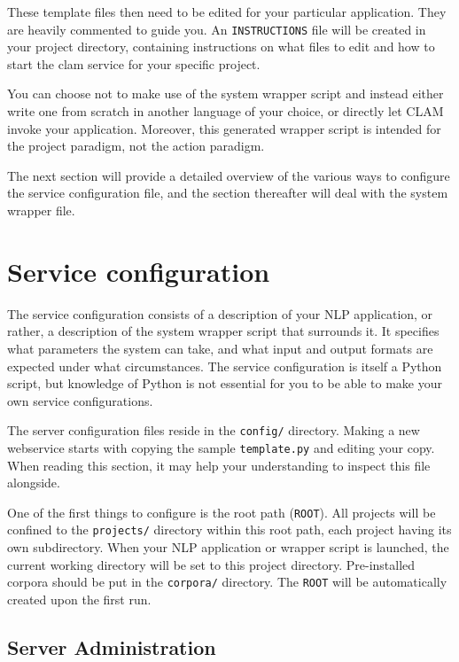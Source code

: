 \documentclass[a4paper,12pt,twoside,openright]{report}
\begin{document}
These template files then need to be edited for your particular application.
They are heavily commented to guide you. An \texttt{INSTRUCTIONS} file will be
created in your project directory, containing instructions on what files to
edit and  how to start the clam service for your specific project.

You can choose not to make use of the system wrapper script and instead either
write one from scratch in another language of your choice, or directly let CLAM
invoke your application. Moreover, this generated wrapper script is intended for the
project paradigm, not the action paradigm.

The next section will provide a detailed overview of the various ways to
configure the service configuration file, and the section thereafter will deal
with the system wrapper file.

\section{Service configuration}
\label{sec:serviceconfig}

The service configuration consists of a description of your NLP application, or
rather, a description of the system wrapper script that surrounds it. It
specifies what parameters the system can take, and what input and output
formats are expected under what circumstances. The service configuration is
itself a Python script, but knowledge of Python is not essential for you to be
able to make your own service configurations. 

The server configuration files reside in the \texttt{config/} directory. Making
a new webservice starts with copying the sample \texttt{template.py} and
editing your copy. When reading this section, it may help your understanding to
inspect this file alongside.

One of the first things to configure is the root path (\texttt{ROOT}). All
projects will be confined to the \texttt{projects/} directory within this root
path, each project having its own subdirectory. When your NLP application or
wrapper script is launched, the current working directory will be set to this
project directory. Pre-installed corpora should be put in the \texttt{corpora/}
directory. The \texttt{ROOT} will be automatically created upon the first run.


\subsection{Server Administration}
\label{sec:sadmin}
\end{document}
